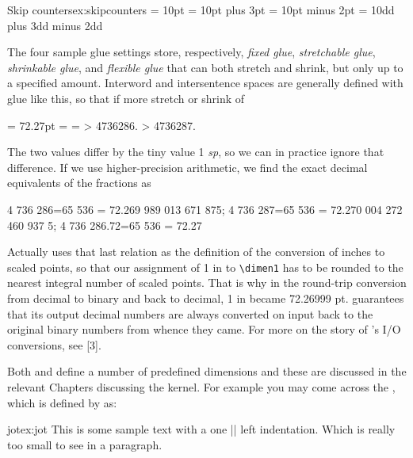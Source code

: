 \begin{texexample}{Skip counters}{ex:skipcounters}
\bgroup
   = 10pt
   = 10pt plus 3pt
   = 10pt minus 2pt
   = 10dd plus 3dd minus 2dd
  \the{}
\egroup  
\end{texexample}


The four sample glue settings store, respectively, \textit{fixed glue}, \textit{stretchable
glue}, \textit{shrinkable glue}, and \textit{flexible glue} that can both stretch and shrink,
but only up to a specified amount. Interword and intersentence spaces are
generally defined with glue like this, so that if more stretch or shrink of

\begin{teX}
 = 72.27pt
 = 
 = 
\showthe {}
> 4736286.
\showthe {}
> 4736287.
\end{teX}

The two values differ by the tiny value 1 \textit{sp}, so we can in practice ignore
that difference. If we use higher-precision arithmetic, we find the exact
decimal equivalents of the fractions as

\begin{teX}
4 736 286=65 536 = 72.269 989 013 671 875;
4 736 287=65 536 = 72.270 004 272 460 937 5;
4 736 286.72=65 536 = 72.27
\end{teX}


Actually \tex uses that last relation as the definition of the conversion of
inches to scaled points, so that our assignment of 1 in to \verb+\dimen1+ has to
be rounded to the nearest integral number of scaled points. That is why
in the round-trip conversion from decimal to binary and back to decimal,
1 in became 72.26999 pt. \tex guarantees that its output decimal numbers
are always converted on input back to the original binary numbers from
whence they came. For more on the story of \tex’s I/O conversions, see [3].


Both \tex and \latex define a number of predefined dimensions and these are discussed in the relevant Chapters discussing the \latex kernel. For example you may come across the , which is defined by \latex as:

\begin{teX}
\newdimen\jot
\jot=3pt
\end{teX}

\begin{texexample}{jot}{ex:jot}
\bgroup
\parindent\jot
This is some sample text with a one |\jot| left indentation. Which is really too small to see in a paragraph.
\egroup
\end{texexample}

